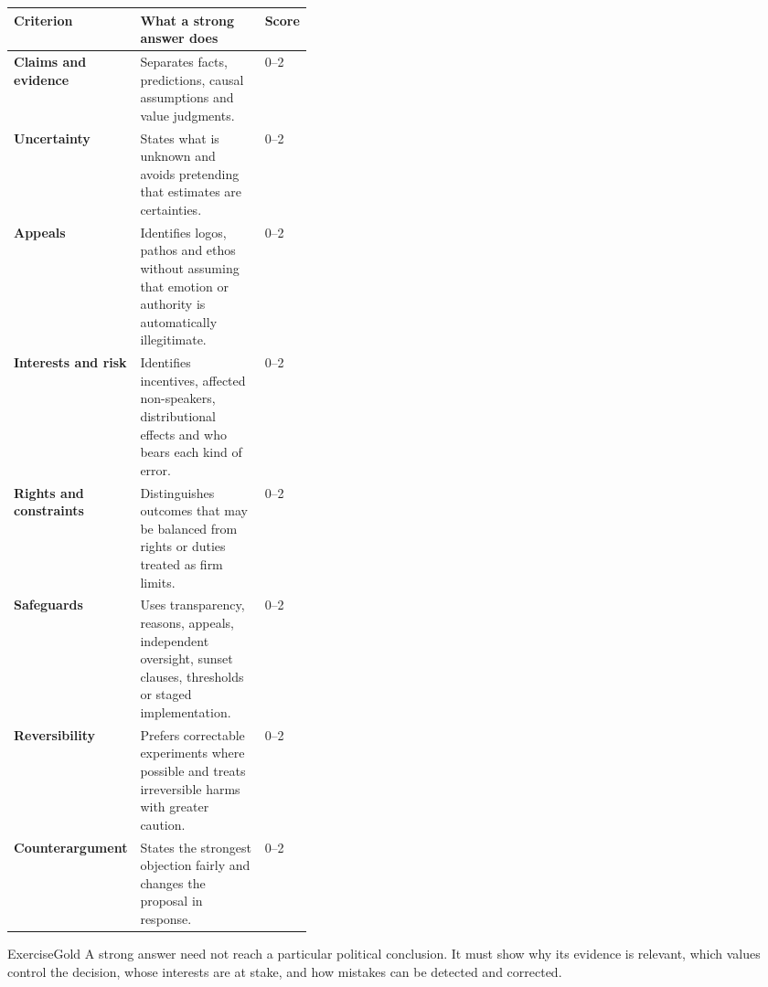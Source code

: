 \documentclass[a4paper,nofonts,sfsidenotes]{tufte-handout}
\newcommand{\tableheaderstrut}{\rule[-0.38\baselineskip]{0pt}{1.2\baselineskip}}
\newcommand{\tablelabel}[1]{{%
  \rule[-0.3\baselineskip]{0pt}{1.55\baselineskip}%
  \noindent\sffamily\bfseries\small #1%
}}
\begin{document}
\begin{fullwidth}
\small
\setlength{\tabcolsep}{7pt}
\renewcommand{\arraystretch}{1.35}
\begin{tabularx}{\linewidth}{|L{0.23\linewidth}|Y|L{0.15\linewidth}|}
\hline
{}
\tableheaderstrut\textsf{\textbf{Criterion}} &
  \textsf{\textbf{What a strong answer does}} &
  \textsf{\textbf{Score}} \\
\hline
{}
\tablelabel{Claims and evidence} &
  Separates facts, predictions, causal assumptions and value judgments. &
  0–2 \\
\hline
{}
\tablelabel{Uncertainty} &
  States what is unknown and avoids pretending that estimates are certainties. &
  0–2 \\
\hline
{}
\tablelabel{Appeals} &
  Identifies logos, pathos and ethos without assuming that emotion or authority
  is automatically illegitimate. &
  0–2 \\
\hline
{}
\tablelabel{Interests and risk} &
  Identifies incentives, affected non-speakers, distributional effects and who
  bears each kind of error. &
  0–2 \\
\hline
{}
\tablelabel{Rights and constraints} &
  Distinguishes outcomes that may be balanced from rights or duties treated as
  firm limits. &
  0–2 \\
\hline
{}
\tablelabel{Safeguards} &
  Uses transparency, reasons, appeals, independent oversight, sunset clauses,
  thresholds or staged implementation. &
  0–2 \\
\hline
{}
\tablelabel{Reversibility} &
  Prefers correctable experiments where possible and treats irreversible harms
  with greater caution. &
  0–2 \\
\hline
{}
\tablelabel{Counterargument} &
  States the strongest objection fairly and changes the proposal in response. &
  0–2 \\
\hline
\end{tabularx}
\end{fullwidth}

\begin{takeawaybox}{ExerciseGold}
A strong answer need not reach a particular political conclusion. It must show
why its evidence is relevant, which values control the decision, whose
interests are at stake, and how mistakes can be detected and corrected.
\end{takeawaybox}
\end{document}
